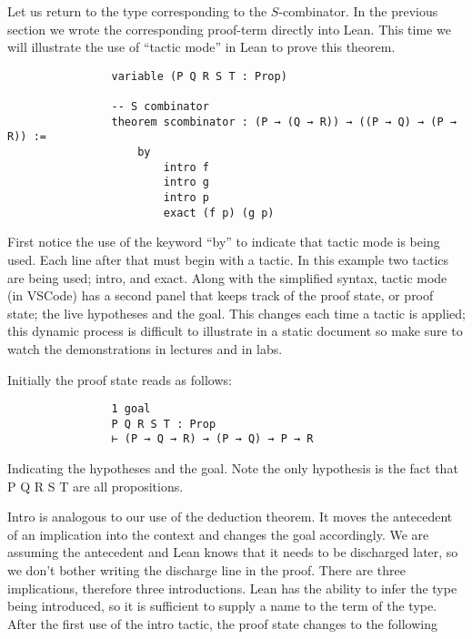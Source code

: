 \documentclass{book}
\begin{document}
    \begin{eg}

        Let us return to the type corresponding to the $S$-combinator. In the previous section we wrote the corresponding proof-term directly into Lean. This time we will illustrate the use of ``tactic mode'' in Lean to prove this theorem. 
        
        \begin{center}
            \begin{lstlisting}
                variable (P Q R S T : Prop)

                -- S combinator
                theorem scombinator : (P → (Q → R)) → ((P → Q) → (P → R)) :=
                    by
                        intro f 
                        intro g 
                        intro p
                        exact (f p) (g p)
            \end{lstlisting}
        \end{center}

        First notice the use of the keyword ``by'' to indicate that tactic mode is being used. Each line after that must begin with a tactic. In this example two tactics are being used; intro, and exact. Along with the simplified syntax, tactic mode (in VSCode) has a second panel that keeps track of the proof state, or proof state; the live hypotheses and the goal. This changes each time a tactic is applied; this dynamic process is difficult to illustrate in a static document so make sure to watch the demonstrations in lectures and in labs. 

        Initially the proof state reads as follows: 

        \begin{center}
            \begin{lstlisting}
                1 goal
                P Q R S T : Prop
                ⊢ (P → Q → R) → (P → Q) → P → R
            \end{lstlisting}
        \end{center}

        Indicating the hypotheses and the goal. Note the only hypothesis is the fact that P Q R S T are all propositions. 

        Intro is analogous to our use of the deduction theorem. It moves the antecedent of an implication into the context and changes the goal accordingly. We are assuming the antecedent and Lean knows that it needs to be discharged later, so we don't bother writing the discharge line in the proof. There are three implications, therefore three introductions. Lean has the ability to infer the type being introduced, so it is sufficient to supply a name to the term of the type. After the first use of the intro tactic, the proof state changes to the following


\end{eg}
\end{document}
